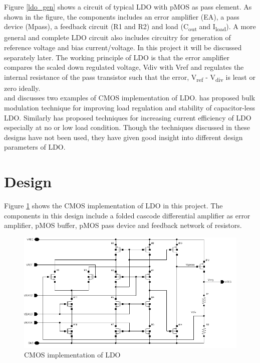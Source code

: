 \documentclass[UKenglish]{ifimaster}  %
\begin{document}
Figure \ref{ldo_gen} shows a circuit of typical LDO with pMOS as pass element. As shown in the figure, the 
components includes an error amplifier (EA), a pass device (Mpass), a feedback circuit (R1 and R2) and load 
(C\textsubscript{out} and I\textsubscript{load}). A more general and complete LDO circuit also includes 
circuitry for generation of reference voltage and bias current/voltage. In this project it will be discussed 
separately later. The working principle of LDO is that the error amplifier compares the scaled down regulated 
voltage, Vdiv with Vref and regulates the internal resistance of the pass transistor such that  the error, 
V\textsubscript{ref} - V\textsubscript{div} is least or zero ideally. \\

\cite{ldo_bulkmod} and \cite{ldo_quiescent} discusses two examples of CMOS implementation of LDO. \cite{ldo_bulkmod} 
has proposed bulk modulation technique for improving load regulation and stability of capacitor-less LDO. 
Similarly \cite{ldo_quiescent} has  proposed techniques for increasing current efficiency of LDO especially at 
no or low load condition. Though the techniques discussed in these designs have not been used, they have given 
good insight into different design parameters of LDO.  \\

\section{Design}		%

Figure \ref{fig:ldo_cmos} shows the CMOS implementation of LDO in this project. The components in this design 
include a folded cascode differential amplifier as error amplifier, pMOS buffer, pMOS pass device and feedback 
network of resistors. \\

\begin{figure}[htbp] %
   \centering
  \includegraphics[width=\textwidth]{img/ldo_schematic.pdf} 
   \caption{CMOS implementation of LDO}
   \label{fig:ldo_cmos}
\end{figure}
\end{document}
